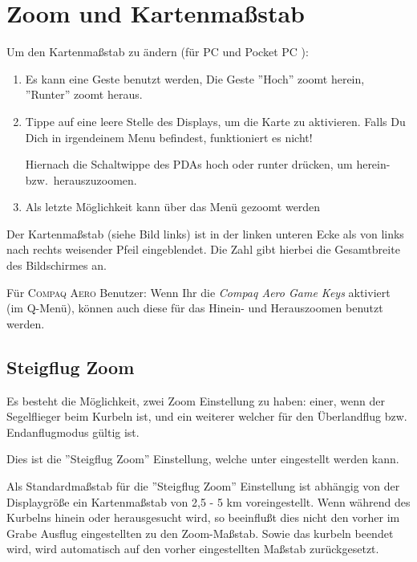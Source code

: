 \section{Zoom und Kartenmaßstab}\label{zoom}\label{kartenmasstab}
Um den Kartenmaßstab zu ändern  (für \textsf{PC}  und  \textsf{Pocket PC} ):
\begin{enumerate}
\item Es kann eine Geste benutzt werden, Die Geste 
     ''Hoch'' zoomt herein,  ''Runter'' zoomt heraus.
  \item Tippe auf eine leere Stelle des Displays, um die Karte zu aktivieren. Falls Du Dich in irgendeinem Menu befindest, funktioniert es nicht! 

  Hiernach die Schaltwippe des \textsf{PDA}s hoch oder runter drücken, um herein- bzw.\ herauszuzoomen.
  
     \item Als letzte Möglichkeit kann über das Menü gezoomt werden
\end{enumerate}

Der Kartenmaßstab (siehe Bild links)  ist in der linken unteren Ecke als von links nach rechts weisender Pfeil eingeblendet.    Die Zahl gibt hierbei die Gesamtbreite des Bildschirmes an.

Für \textsc{Compaq Aero} Benutzer: Wenn Ihr die \textsl{Compaq Aero Game Keys} aktiviert (im Q-Menü), können auch diese für das Hinein- und Herauszoomen benutzt werden.

\subsection*{Steigflug Zoom}
Es besteht die Möglichkeit, zwei Zoom Einstellung zu haben: einer, wenn der Segelflieger beim Kurbeln ist, und ein weiterer welcher für den Überlandflug bzw. Endanflugmodus gültig ist.

Dies ist die ''Steigflug Zoom'' Einstellung, welche unter  eingestellt werden kann.

Als Standardmaßstab für die ''Steigflug Zoom'' Einstellung ist abhängig  von der Displaygröße ein Kartenmaßstab von 2,5 - 5 km voreingestellt.
Wenn während des Kurbelns hinein oder herausgesucht wird, so beeinflußt dies nicht den vorher im Grabe Ausflug eingestellten zu den Zoom-Maßstab. Sowie das kurbeln beendet wird, wird automatisch auf den vorher eingestellten Maßstab zurückgesetzt.
